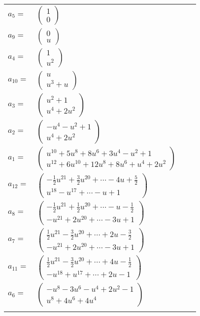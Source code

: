 \documentclass[1p]{elsarticle_modified}
\theoremstyle{definition}
\begin{document}
\begin{tabular}{m{7pt} m{180pt} m{7pt} m{180pt} }
\flushright $a_{5}=$&$\begin{pmatrix}1\\0\end{pmatrix}$ \\
\flushright $a_{9}=$&$\begin{pmatrix}0\\u\end{pmatrix}$ \\
\flushright $a_{4}=$&$\begin{pmatrix}1\\u^2\end{pmatrix}$ \\
\flushright $a_{10}=$&$\begin{pmatrix}u\\u^3+u\end{pmatrix}$ \\
\flushright $a_{3}=$&$\begin{pmatrix}u^2+1\\u^4+2 u^2\end{pmatrix}$ \\
\flushright $a_{2}=$&$\begin{pmatrix}- u^4- u^2+1\\u^4+2 u^2\end{pmatrix}$ \\
\flushright $a_{1}=$&$\begin{pmatrix}u^{10}+5 u^8+8 u^6+3 u^4- u^2+1\\u^{12}+6 u^{10}+12 u^8+8 u^6+u^4+2 u^2\end{pmatrix}$ \\
\flushright $a_{12}=$&$\begin{pmatrix}-\frac{1}{2} u^{21}+\frac{3}{2} u^{20}+\cdots-4 u+\frac{5}{2}\\u^{18}- u^{17}+\cdots- u+1\end{pmatrix}$ \\
\flushright $a_{8}=$&$\begin{pmatrix}-\frac{1}{2} u^{21}+\frac{1}{2} u^{20}+\cdots- u-\frac{1}{2}\\- u^{21}+2 u^{20}+\cdots-3 u+1\end{pmatrix}$ \\
\flushright $a_{7}=$&$\begin{pmatrix}\frac{1}{2} u^{21}-\frac{3}{2} u^{20}+\cdots+2 u-\frac{3}{2}\\- u^{21}+2 u^{20}+\cdots-3 u+1\end{pmatrix}$ \\
\flushright $a_{11}=$&$\begin{pmatrix}\frac{1}{2} u^{21}-\frac{3}{2} u^{20}+\cdots+4 u-\frac{1}{2}\\- u^{18}+u^{17}+\cdots+2 u-1\end{pmatrix}$ \\
\flushright $a_{6}=$&$\begin{pmatrix}- u^8-3 u^6- u^4+2 u^2-1\\u^8+4 u^6+4 u^4\end{pmatrix}$\\&\end{tabular}
\end{document}
